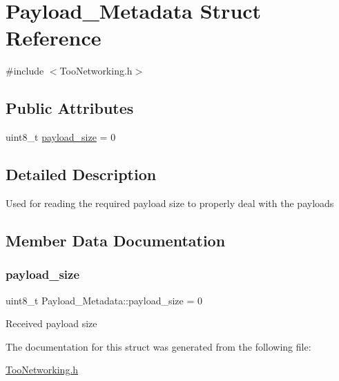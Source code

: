\hypertarget{structPayload__Metadata}{}\section{Payload\+\_\+\+Metadata Struct Reference}
\label{structPayload__Metadata}


{\ttfamily \#include $<$Too\+Networking.\+h$>$}

\subsection*{Public Attributes}
\begin{DoxyCompactItemize}
\item 
uint8\+\_\+t \hyperlink{structPayload__Metadata_a5d517fb1e486f468bef3f42b93b6707d}{payload\+\_\+size} = 0
\end{DoxyCompactItemize}


\subsection{Detailed Description}
Used for reading the required payload size to properly deal with the payloads 

\subsection{Member Data Documentation}
\mbox{\label{structPayload__Metadata_a5d517fb1e486f468bef3f42b93b6707d}} 
\subsubsection{\texorpdfstring{payload\+\_\+size}{payload\_size}}
{\footnotesize\ttfamily uint8\+\_\+t Payload\+\_\+\+Metadata\+::payload\+\_\+size = 0}

Received payload size 

The documentation for this struct was generated from the following file\+:\begin{DoxyCompactItemize}
\item 
\hyperlink{TooNetworking_8h}{Too\+Networking.\+h}\end{DoxyCompactItemize}
